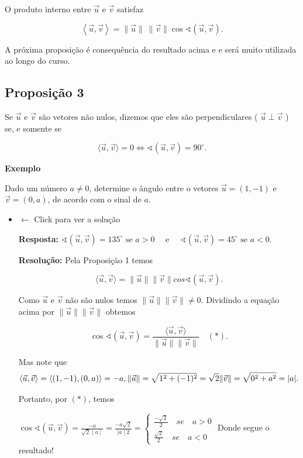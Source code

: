 \documentclass[
  brazilian,
  letterpaper,
  DIV=11,
  numbers=noendperiod]{scrreprt}
\theoremstyle{definition}
\theoremstyle{plain}
\theoremstyle{definition}
\theoremstyle{remark}
\begin{document}
O produto interno entre \(\vec{u}\) e \(\vec{v}\) satisfaz

\[
\left\langle\vec{u},\vec{v}\right\rangle=\|\vec{u}\|\:\|\vec{v}\| \cos \sphericalangle
(﻿\vec{u},\vec{v}).
\]

A próxima proposição é consequência do resultado acima e e será muito
utilizada ao longo do curso.

\subsection{Proposição 3}\label{proposiuxe7uxe3o-3-1}

Se \(\vec{u}\) e \(\vec{v}\) são vetores não nulos, dizemos que eles são
perpendiculares ( \(\vec{u}\perp\vec{v}\) ) se, e somente se

\[
\langle\vec{u},\vec{v}\rangle=0\Leftrightarrow
\sphericalangle(\vec{u},\vec{v}) = 90^\circ.
\]

\textbf{Exemplo}

Dado um número \(a\ne0\), determine o ângulo entre o vetores
\(\vec{u}=(1,-1)\) e \(\vec{v}=(0,a)\), de acordo com o sinal de \(a\).

\begin{itemize}
\item
  \(\leftarrow\) Click para ver a solução

  \textbf{Resposta:}
  \(\sphericalangle(\vec{u},\vec{v})=135^\circ \text{ se } a>0 \quad \text{ e }  \quad \sphericalangle(\vec{u},\vec{v})=45^\circ  \text{ se } a<0\).

  \textbf{Resolução:} Pela Proposição 1 temos

  \[
     \langle\vec{u},\vec{v}\rangle=\lVert\vec{u}\rVert\lVert\vec{v}\rVert cos\sphericalangle(\vec{u},\vec{v}).
    \]

  Como \(\vec{u}\) e \(\vec{v}\) não são nulos temos
  \(\lVert\vec{u}\rVert\lVert\vec{v}\rVert\neq0\). Dividindo a equação
  acima por \(\lVert\vec{u}\rVert\lVert\vec{v}\rVert\) obtemos

  \[
    \cos\sphericalangle(\vec{u},\vec{v})=\frac{\langle\vec{u},\vec{v}\rangle}{\lVert\vec{u}\rVert\lVert\vec{v}\rVert} \quad (\ast).
    \]

  Mas note que \[
    \langle\vec{u},\vec{v}\rangle=\langle (1,-1),(0,a) \rangle=-a , \\ \lVert\vec{u}\rVert=\sqrt{1^2+(-1)^2}=\sqrt{2}\\\lVert\vec{v}\rVert=\sqrt{0^2+a^2}=|a| .
    \]

  Portanto, por \((\ast)\), temos

  \(\cos\sphericalangle\left(\vec{u},\vec{v}\right)=\frac{-a}{\sqrt{2}\mid a\mid}=\frac{-a\sqrt{2}}{\mid a\mid2}=\begin{cases}
    \frac{-\sqrt{2}}{2}\quad  se\quad a>0 \\
    \frac{\sqrt{2}}{2}\quad  se\quad a<0
    \end{cases}\) Donde segue o resultado!
\end{itemize}
\end{document}

